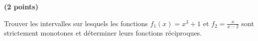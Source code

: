 \begin{exercice}\label{exoExosenvrac-0015A}\textbf{ (2 points) }

Trouver les intervalles sur lesquels les fonctions $f_1(x)= x^3+1$ et $\displaystyle f_2= \frac{x}{x-2}$ sont strictement monotones et  déterminer leurs fonctions réciproques. 


\end{exercice}

